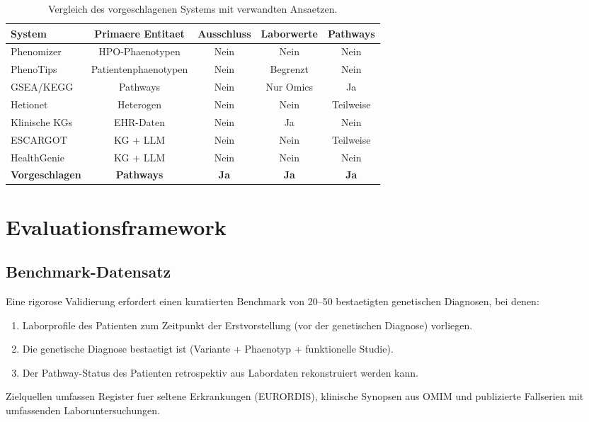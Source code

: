\documentclass[12pt,a4paper]{article}
\begin{document}
\begin{table}[H]
\centering
\caption{Vergleich des vorgeschlagenen Systems mit verwandten Ansaetzen.}
\label{de:tab:comparison}
\begin{tabular}{lcccc}
\toprule
\textbf{System} & \textbf{Primaere Entitaet} & \textbf{Ausschluss} & \textbf{Laborwerte} & \textbf{Pathways} \\
\midrule
Phenomizer & HPO-Phaenotypen & Nein & Nein & Nein \\
PhenoTips & Patientenphaenotypen & Nein & Begrenzt & Nein \\
GSEA/KEGG & Pathways & Nein & Nur Omics & Ja \\
Hetionet & Heterogen & Nein & Nein & Teilweise \\
Klinische KGs & EHR-Daten & Nein & Ja & Nein \\
ESCARGOT & KG + LLM & Nein & Nein & Teilweise \\
HealthGenie & KG + LLM & Nein & Nein & Nein \\
\textbf{Vorgeschlagen} & \textbf{Pathways} & \textbf{Ja} & \textbf{Ja} & \textbf{Ja} \\
\bottomrule
\end{tabular}
\end{table}

\section*{Evaluationsframework}
\label{de:sec:evaluation}

\subsection*{Benchmark-Datensatz}

Eine rigorose Validierung erfordert einen kuratierten Benchmark von 20--50 bestaetigten genetischen Diagnosen, bei denen:
\begin{enumerate}
    \item Laborprofile des Patienten zum Zeitpunkt der Erstvorstellung (vor der genetischen Diagnose) vorliegen.
    \item Die genetische Diagnose bestaetigt ist (Variante + Phaenotyp + funktionelle Studie).
    \item Der Pathway-Status des Patienten retrospektiv aus Labordaten rekonstruiert werden kann.
\end{enumerate}

Zielquellen umfassen Register fuer seltene Erkrankungen (EURORDIS), klinische Synopsen aus OMIM und publizierte Fallserien mit umfassenden Laboruntersuchungen.
\end{document}
